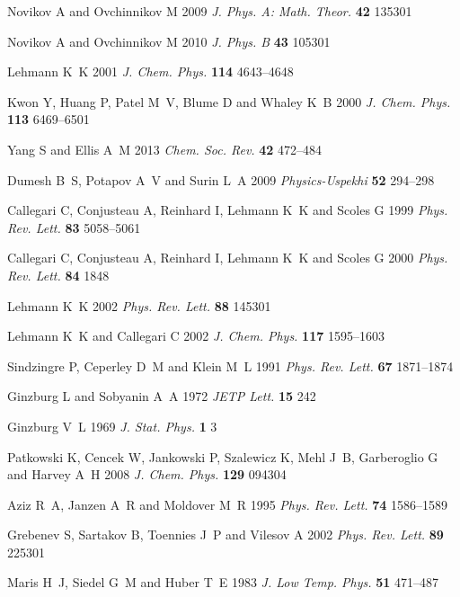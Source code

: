 \documentclass[12pt]{iopart}
\begin{document}
\begin{thebibliography}{100}
Novikov A and Ovchinnikov M 2009 {\em J. Phys. A: Math. Theor.\/} {\bf 42}
  135301

Novikov A and Ovchinnikov M 2010 {\em J. Phys. B\/} {\bf 43} 105301

Lehmann K~K 2001 {\em J. Chem. Phys.\/} {\bf 114} 4643--4648

Kwon Y, Huang P, Patel M~V, Blume D and Whaley K~B 2000 {\em J. Chem. Phys.\/}
  {\bf 113} 6469--6501

Yang S and Ellis A~M 2013 {\em Chem. Soc. Rev.\/} {\bf 42} 472--484

Dumesh B~S, Potapov A~V and Surin L~A 2009 {\em Physics-Uspekhi\/} {\bf 52}
  294--298

Callegari C, Conjusteau A, Reinhard I, Lehmann K~K and Scoles G 1999 {\em Phys.
  Rev. Lett.\/} {\bf 83} 5058--5061

Callegari C, Conjusteau A, Reinhard I, Lehmann K~K and Scoles G 2000 {\em Phys.
  Rev. Lett.\/} {\bf 84} 1848

Lehmann K~K 2002 {\em Phys. Rev. Lett.\/} {\bf 88} 145301

Lehmann K~K and Callegari C 2002 {\em J. Chem. Phys.\/} {\bf 117} 1595--1603

Sindzingre P, Ceperley D~M and Klein M~L 1991 {\em Phys. Rev. Lett.\/} {\bf 67}
  1871--1874

Ginzburg L and Sobyanin A~A 1972 {\em JETP Lett.\/} {\bf 15} 242

Ginzburg V~L 1969 {\em J. Stat. Phys.\/} {\bf 1} 3

Patkowski K, Cencek W, Jankowski P, Szalewicz K, Mehl J~B, Garberoglio G and
  Harvey A~H 2008 {\em J. Chem. Phys.\/} {\bf 129} 094304

Aziz R~A, Janzen A~R and Moldover M~R 1995 {\em Phys. Rev. Lett.\/} {\bf 74}
  1586--1589

Grebenev S, Sartakov B, Toennies J~P and Vilesov A 2002 {\em Phys. Rev.
  Lett.\/} {\bf 89} 225301

Maris H~J, Siedel G~M and Huber T~E 1983 {\em J. Low Temp. Phys.\/} {\bf 51}
  471--487


\end{thebibliography}
\end{document}
